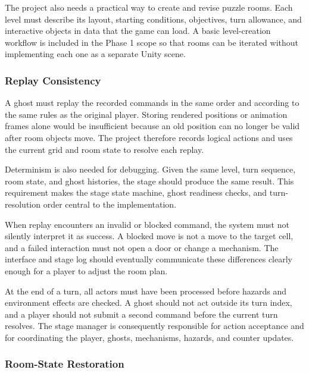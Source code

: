 The project also needs a practical way to create and revise puzzle rooms. Each level must describe its layout, starting conditions, objectives, turn allowance, and interactive objects in data that the game can load. A basic level-creation workflow is included in the Phase 1 scope so that rooms can be iterated without implementing each one as a separate Unity scene.

\subsubsection{Replay Consistency}

A ghost must replay the recorded commands in the same order and according to the same rules as the original player. Storing rendered positions or animation frames alone would be insufficient because an old position can no longer be valid after room objects move. The project therefore records logical actions and uses the current grid and room state to resolve each replay.

Determinism is also needed for debugging. Given the same level, turn sequence, room state, and ghost histories, the stage should produce the same result. This requirement makes the stage state machine, ghost readiness checks, and turn-resolution order central to the implementation.


When replay encounters an invalid or blocked command, the system must not silently interpret it as success. A blocked move is not a move to the target cell, and a failed interaction must not open a door or change a mechanism. The interface and stage log should eventually communicate these differences clearly enough for a player to adjust the room plan.


At the end of a turn, all actors must have been processed before hazards and environment effects are checked. A ghost should not act outside its turn index, and a player should not submit a second command before the current turn resolves. The stage manager is consequently responsible for action acceptance and for coordinating the player, ghosts, mechanisms, hazards, and counter updates.

\subsubsection{Room-State Restoration}

